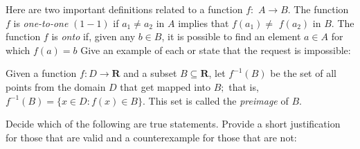 \begin{solution}
  
\end{solution}

\begin{exercise}
  Here are two important definitions related to a function $f:$ $A \rightarrow B .$ The function $f$ is \emph{one-to-one} $(1-1)$ if $a_{1} \neq a_{2}$ in $A$ implies that $f\left(a_{1}\right) \neq$ $f\left(a_{2}\right)$ in $B$. The function $f$ is \emph{onto} if, given any $b \in B$, it is possible to find an element $a \in A$ for which $f(a)=b$
  Give an example of each or state that the request is impossible:
\end{exercise}

\begin{solution}
  
\end{solution}

\begin{exercise}
  Given a function $f: D \rightarrow \mathbf{R}$ and a subset $B \subseteq \mathbf{R}$, let $f^{-1}(B)$ be the set of all points from the domain $D$ that get mapped into $B ;$ that is, $f^{-1}(B)=\{x \in D: f(x) \in B\} .$ This set is called the \emph{preimage} of $B$.
\end{exercise}

\begin{solution}
  
\end{solution}


\begin{exercise}
  Decide which of the following are true statements. Provide a short justification for those that are valid and a counterexample for those that are not:
\end{exercise}



